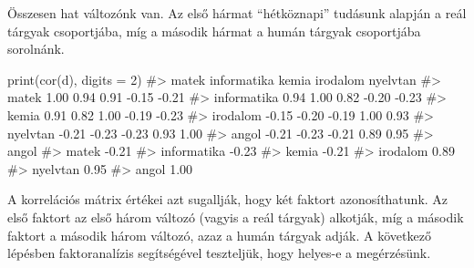\documentclass[
  letterpaper,
]{krantz}
\makeatletter
\newenvironment{Shaded}{\begin{snugshade}}{\end{snugshade}}
\newcommand{\AttributeTok}[1]{\textcolor[rgb]{0.40,0.45,0.13}{#1}}
\newcommand{\CommentTok}[1]{\textcolor[rgb]{0.37,0.37,0.37}{#1}}
\newcommand{\DecValTok}[1]{\textcolor[rgb]{0.68,0.00,0.00}{#1}}
\newcommand{\FunctionTok}[1]{\textcolor[rgb]{0.28,0.35,0.67}{#1}}
\newcommand{\NormalTok}[1]{\textcolor[rgb]{0.00,0.23,0.31}{#1}}
\newenvironment{kframe}{%
\medskip{}
\setlength{\fboxsep}{.8em}
 \def\at@end@of@kframe{}%
 \ifinner\ifhmode%
  \def\at@end@of@kframe{\end{minipage}}%
  \begin{minipage}{\columnwidth}%
 \fi\fi%
 \def\FrameCommand##1{\hskip\@totalleftmargin \hskip-\fboxsep
 \colorbox{shadecolor}{##1}\hskip-\fboxsep
     \hskip-\linewidth \hskip-\@totalleftmargin \hskip\columnwidth}%
 \MakeFramed {\advance\hsize-\width
   \@totalleftmargin\z@ \linewidth\hsize
   \@setminipage}}%
 {\par\unskip\endMakeFramed%
 \at@end@of@kframe}
\renewenvironment{Shaded}{\begin{kframe}}{\end{kframe}}
\makeatother
\begin{document}
Összesen hat változónk van. Az első hármat ``hétköznapi'' tudásunk
alapján a reál tárgyak csoportjába, míg a második hármat a humán tárgyak
csoportjába sorolnánk.

\begin{Shaded}
\begin{Highlighting}[]
\FunctionTok{print}\NormalTok{(}\FunctionTok{cor}\NormalTok{(d), }\AttributeTok{digits =} \DecValTok{2}\NormalTok{)}
\CommentTok{\#\textgreater{}             matek informatika kemia irodalom nyelvtan}
\CommentTok{\#\textgreater{} matek        1.00        0.94  0.91    {-}0.15    {-}0.21}
\CommentTok{\#\textgreater{} informatika  0.94        1.00  0.82    {-}0.20    {-}0.23}
\CommentTok{\#\textgreater{} kemia        0.91        0.82  1.00    {-}0.19    {-}0.23}
\CommentTok{\#\textgreater{} irodalom    {-}0.15       {-}0.20 {-}0.19     1.00     0.93}
\CommentTok{\#\textgreater{} nyelvtan    {-}0.21       {-}0.23 {-}0.23     0.93     1.00}
\CommentTok{\#\textgreater{} angol       {-}0.21       {-}0.23 {-}0.21     0.89     0.95}
\CommentTok{\#\textgreater{}             angol}
\CommentTok{\#\textgreater{} matek       {-}0.21}
\CommentTok{\#\textgreater{} informatika {-}0.23}
\CommentTok{\#\textgreater{} kemia       {-}0.21}
\CommentTok{\#\textgreater{} irodalom     0.89}
\CommentTok{\#\textgreater{} nyelvtan     0.95}
\CommentTok{\#\textgreater{} angol        1.00}
\end{Highlighting}
\end{Shaded}

A korrelációs mátrix értékei azt sugallják, hogy két faktort
azonosíthatunk. Az első faktort az első három változó (vagyis a reál
tárgyak) alkotják, míg a második faktort a második három változó, azaz a
humán tárgyak adják. A következő lépésben faktoranalízis segítségével
teszteljük, hogy helyes-e a megérzésünk.
\end{document}
